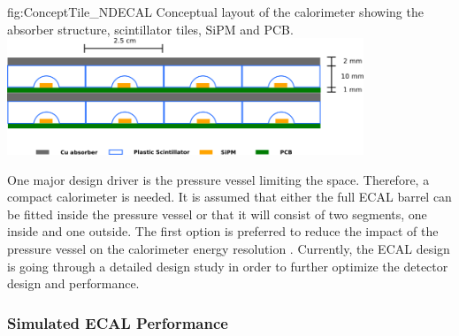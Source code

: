 \begin{dunefigure}{fig:ConceptTile_NDECAL}
  {Conceptual layout of the calorimeter showing the absorber structure, scintillator tiles, SiPM and PCB.}
\includegraphics[width=0.8\textwidth]{graphics/TileConcept.png}
\end{dunefigure}

One major design driver is the pressure vessel limiting the space. Therefore, a compact calorimeter is needed. It is assumed that either the full ECAL barrel can be fitted inside the pressure vessel or that it will consist of two segments, one inside and one outside. The first option is preferred to reduce the impact of the pressure vessel on the calorimeter energy resolution \cite{Emberger:2018pgr}. Currently, the ECAL design is going through a detailed design study in order to further optimize the detector design and performance.

\subsubsection{Simulated ECAL Performance}

